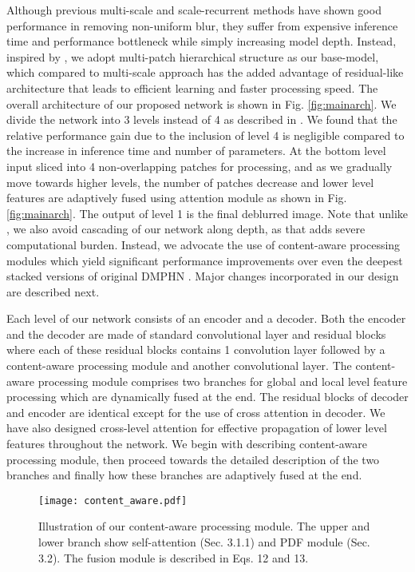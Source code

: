 \documentclass[10pt,twocolumn,letterpaper]{article}
\begin{document}
Although previous multi-scale and scale-recurrent methods have shown good performance in removing non-uniform blur, they suffer from expensive inference time and performance bottleneck while simply increasing model depth. Instead, inspired by \cite{zhang2019deep} , we adopt multi-patch hierarchical structure as our base-model, which compared to multi-scale approach has the added advantage of residual-like architecture that leads to efficient learning and faster processing speed.
The overall architecture of our proposed network is shown in Fig. \ref{fig:mainarch}. We divide the network into 3 levels instead of 4 as described in \cite{zhang2019deep}. We found that the relative performance gain due to the inclusion of level 4 is negligible compared to the increase in inference time and number of parameters. At the bottom level input sliced into 4 non-overlapping patches for processing, and as we gradually move towards higher levels, the number of patches decrease and lower level features are adaptively fused using attention module as shown in Fig. \ref{fig:mainarch}. The output of level 1 is the final deblurred image. Note that unlike \cite{zhang2019deep}, we also avoid cascading of our network along depth, as that adds severe computational burden. Instead, we advocate the use of content-aware processing modules which yield significant performance improvements over even the deepest stacked versions of original DMPHN \cite{zhang2019deep}. Major changes incorporated in our design are described next.

\par Each level of our network consists of an encoder and a decoder. Both the encoder and the decoder are made of standard convolutional layer and residual blocks where each of these residual blocks contains 1 convolution layer followed by a content-aware processing module and another convolutional layer. The content-aware processing module comprises two branches for global and local level feature processing which are dynamically fused at the end. The residual blocks of decoder and encoder are identical except for the use of cross attention in decoder. We have also designed cross-level attention for effective propagation of lower level features throughout the network. We begin with describing content-aware processing module, then proceed towards the detailed description of the two branches and finally how these branches are adaptively fused at the end.

\begin{figure*}[t]
\begin{center}
\texttt{[image: content\_aware.pdf]}
\end{center}
   \caption{Illustration of our content-aware processing module. The upper and lower branch show self-attention (Sec. 3.1.1) and PDF module (Sec. 3.2). The fusion module is described in Eqs. 12 and 13.}
\label{fig:long}
\label{fig:onecol}
\end{figure*}
\end{document}
